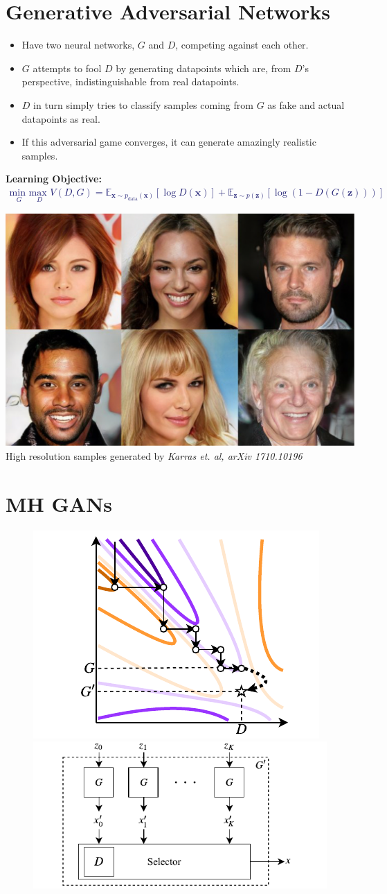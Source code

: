 \documentclass[a0,landscape]{a0poster}
\newcommand{\mbf}[1]{{\boldsymbol{\mathbf{#1}}}}
\renewcommand{\bm}{\mbf}
\begin{document}
\begin{multicols}{3}
\section*{\fontsize{67.1}{82} \selectfont \color{NavyBlue} Generative Adversarial Networks \color{Black}}
\setlength{}  
\setlength\leftmargini{\dimexpr\leftmargini + 0.5em\relax}
\vspace{-.5in}
\begin{itemize}
\item Have two neural networks, $G$ and $D$, competing against each other. 
\item $G$ attempts to fool $D$ by generating datapoints which are, from $D$'s perspective, indistinguishable from real datapoints.
\item $D$ in turn simply tries to classify samples coming from $G$ as fake and actual datapoints as real.
\item If this adversarial game converges, it can generate amazingly realistic samples.
\end{itemize}
\textbf{Learning Objective:}
\textcolor{MidnightBlue}{
  \begin{align}
    \underset{G}{\text{min }}\underset{D} {\text{max }} V(D,G) = \mathbb{E}_{\bm{x} \sim p_{\text{data}}(\bm{x})} [\log D(\bm{x})]
    + \mathbb{E}_{\bm{z} \sim p(\bm{z})} [\log(1-D(G(\bm{z})))] \nonumber
  \end{align}}
\begin{centering}
\includegraphics[width=.1\textwidth]{goodsamples.pdf} \\
\small High resolution samples generated by \emph{Karras et. al, arXiv 1710.10196} \\
\end{centering}
\vspace{-.8in}

\section*{\fontsize{67.1}{82} \selectfont \color{NavyBlue} MH GANs \color{Black}}
\begin{figure}[H]
\centering
\includegraphics[width=.1\textwidth]{../figures/coord_descent.pdf}
\includegraphics[width=.1\textwidth]{../figures/block_diag.pdf}
\end{figure}


\end{multicols}
\end{document}

